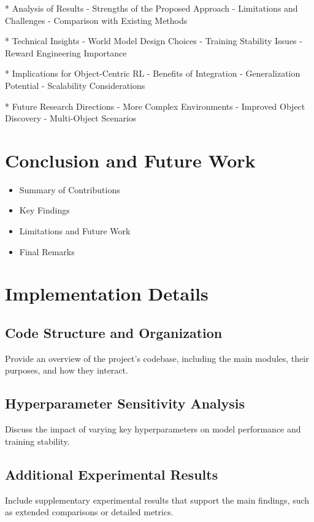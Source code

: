 \documentclass[
	english,
	ruledheaders=section,
	class=report,
	thesis={type=master},
	accentcolor=9c,
	custommargins=true,
	marginpar=false,
	parskip=half-,
	fontsize=11pt,
]{tudapub}
\begin{document}
* Analysis of Results
- Strengths of the Proposed Approach
- Limitations and Challenges
- Comparison with Existing Methods

* Technical Insights
- World Model Design Choices
- Training Stability Issues
- Reward Engineering Importance

* Implications for Object-Centric RL
- Benefits of Integration
- Generalization Potential
- Scalability Considerations

* Future Research Directions
- More Complex Environments
- Improved Object Discovery
- Multi-Object Scenarios

\chapter{Conclusion and Future Work}
\label{chap:conclusion}

\begin{itemize}
	\item Summary of Contributions
	\item Key Findings
	\item Limitations and Future Work
	\item Final Remarks
\end{itemize}

\printbibliography[title={References}]

\appendix

\chapter{Implementation Details}
\label{app:implementation}

\section{Code Structure and Organization}
\label{app:code_structure}
Provide an overview of the project's codebase, including the main modules, their purposes, and how they interact.

\section{Hyperparameter Sensitivity Analysis}
\label{app:hyperparameter_analysis}
Discuss the impact of varying key hyperparameters on model performance and training stability.

\section{Additional Experimental Results}
\label{app:additional_results}
Include supplementary experimental results that support the main findings, such as extended comparisons or detailed metrics.
\end{document}
